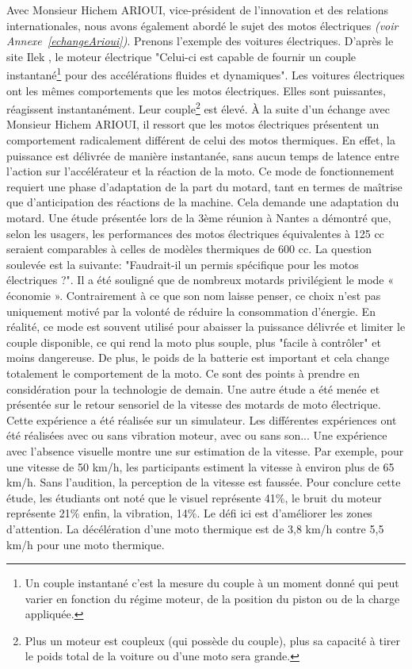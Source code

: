 Avec Monsieur Hichem ARIOUI, vice-président de l’innovation et des relations internationales, nous avons également abordé le sujet des motos électriques \emph{(voir Annexe~\ref{echangeArioui})}. Prenons l'exemple des voitures électriques.
D'après le site Ilek \cite{voiture_electrique}, le moteur électrique "Celui-ci est capable de fournir un couple instantané\footnote{Un couple instantané c’est la mesure du couple à un moment donné qui peut varier en fonction du régime moteur, de la position du piston ou de la charge appliquée.} pour des accélérations fluides et dynamiques". Les voitures électriques ont les mêmes comportements que les motos électriques. Elles sont puissantes, réagissent instantanément. Leur couple\footnote{Plus un moteur est coupleux (qui possède du couple), plus sa capacité à tirer le poids total de la voiture ou d'une moto sera grande.} est élevé.
À la suite d’un échange avec Monsieur Hichem ARIOUI, il ressort que les motos électriques présentent un comportement radicalement différent de celui des motos thermiques. En effet, la puissance est délivrée de manière instantanée, sans aucun temps de latence entre l’action sur l’accélérateur et la réaction de la moto. Ce mode de fonctionnement requiert une phase d’adaptation de la part du motard, tant en termes de maîtrise que d’anticipation des réactions de la machine. Cela demande une adaptation du motard. Une étude présentée lors de la 3ème réunion  \cite{reunionProjet2025} à Nantes a démontré que, selon les usagers, les performances des motos électriques équivalentes à 125 cc seraient comparables à celles de modèles thermiques de 600 cc. La question soulevée est la suivante: "Faudrait-il un permis spécifique pour les motos électriques ?".
Il a été souligné que de nombreux motards privilégient le mode « économie ». Contrairement à ce que son nom laisse penser, ce choix n’est pas uniquement motivé par la volonté de réduire la consommation d'énergie. En réalité, ce mode est souvent utilisé pour abaisser la puissance délivrée et limiter le couple disponible, ce qui rend la moto plus souple, plus "facile à contrôler" et moins dangereuse. 
De plus, le poids de la batterie est important et cela change totalement le comportement de la moto. Ce sont des points à prendre en considération pour la technologie de demain.
Une autre étude a été menée et présentée\cite{reunionProjet2025} sur le retour sensoriel de la vitesse des motards de moto électrique. Cette expérience a été réalisée sur un simulateur. Les différentes expériences ont été réalisées avec ou sans vibration moteur, avec ou sans son... Une expérience avec l'absence visuelle montre une sur estimation de la vitesse. Par exemple, pour une vitesse de 50 km/h, les participants estiment la vitesse à environ plus de 65 km/h. Sans l'audition, la perception de la vitesse est faussée. Pour conclure cette étude, les étudiants ont noté que le visuel représente 41\%, le bruit du moteur représente 21\% enfin, la vibration, 14\%. Le défi ici est d'améliorer les zones d'attention. La décélération d'une moto thermique est de 3,8 km/h contre 5,5 km/h pour une moto thermique.
\vspace{0.5cm} %


